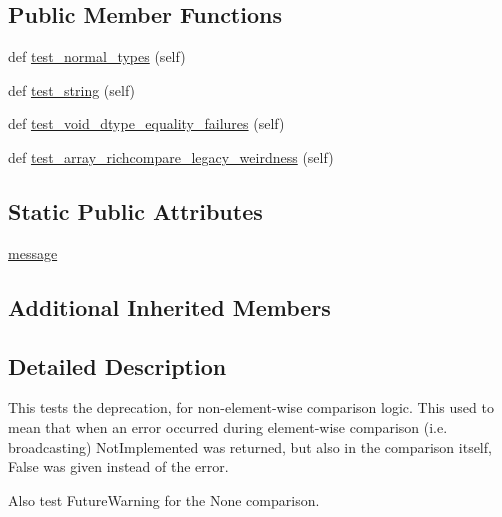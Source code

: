 \subsection*{Public Member Functions}
\begin{DoxyCompactItemize}
\item 
def \hyperlink{classnumpy_1_1core_1_1tests_1_1test__deprecations_1_1TestComparisonDeprecations_a2f9c90eaf6b4b093aa7eddd6cc46279e}{test\+\_\+normal\+\_\+types} (self)
\item 
def \hyperlink{classnumpy_1_1core_1_1tests_1_1test__deprecations_1_1TestComparisonDeprecations_af7575e1d80b97aeb9fda8195823d9429}{test\+\_\+string} (self)
\item 
def \hyperlink{classnumpy_1_1core_1_1tests_1_1test__deprecations_1_1TestComparisonDeprecations_a306c749605a30e057e584291af26b899}{test\+\_\+void\+\_\+dtype\+\_\+equality\+\_\+failures} (self)
\item 
def \hyperlink{classnumpy_1_1core_1_1tests_1_1test__deprecations_1_1TestComparisonDeprecations_a672162b869ae02ee9f3e27566de5ba18}{test\+\_\+array\+\_\+richcompare\+\_\+legacy\+\_\+weirdness} (self)
\end{DoxyCompactItemize}
\subsection*{Static Public Attributes}
\begin{DoxyCompactItemize}
\item 
\hyperlink{classnumpy_1_1core_1_1tests_1_1test__deprecations_1_1TestComparisonDeprecations_a6c63eded6062f74684c1e9b29600cd88}{message}
\end{DoxyCompactItemize}
\subsection*{Additional Inherited Members}


\subsection{Detailed Description}
\begin{DoxyVerb}This tests the deprecation, for non-element-wise comparison logic.
This used to mean that when an error occurred during element-wise comparison
(i.e. broadcasting) NotImplemented was returned, but also in the comparison
itself, False was given instead of the error.

Also test FutureWarning for the None comparison.
\end{DoxyVerb}
 

